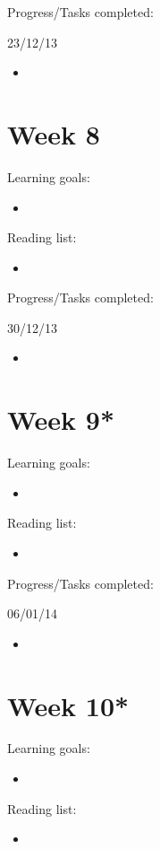 \documentclass[a4paper, 10pt, envcountsect, runningheads]{article}
\begin{document}
Progress/Tasks completed:

23/12/13
\begin{itemize}
\item 
\end{itemize}



\newpage
\section*{Week 8}
Learning goals:
\begin{itemize}
\item 
\end{itemize}

Reading list:
\begin{itemize}
\item 
\end{itemize}

Progress/Tasks completed:

30/12/13
\begin{itemize}
\item 
\end{itemize}



\newpage
\section*{Week 9*}
Learning goals:
\begin{itemize}
\item 
\end{itemize}

Reading list:
\begin{itemize}
\item 
\end{itemize}

Progress/Tasks completed:

06/01/14
\begin{itemize}
\item 
\end{itemize}



\newpage
\section*{Week 10*}
Learning goals:
\begin{itemize}
\item 
\end{itemize}

Reading list:
\begin{itemize}
\item 
\end{itemize}
\end{document}
